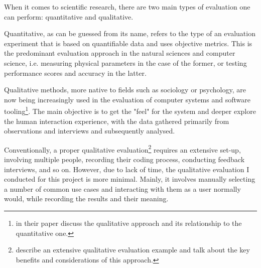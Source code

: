 \documentclass[sigplan,screen]{acmart}
\begin{document}
When it comes to scientific research, there are two main types of evaluation one can perform: quantitative and qualitative.

Quantitative, as can be guessed from its name, refers to the type of an evaluation experiment that is based on quantifiable data and uses objective metrics. This is the predominant evaluation approach in the natural sciences and computer science, i.e. measuring physical parameters in the case of the former, or testing performance scores and accuracy in the latter.

Qualitative methods, more native to fields such as sociology or psychology, are now being increasingly used in the evaluation of computer systems and software tooling\footnote{\cite{Hazz06a} in their paper discuss the qualitative approach and its relationship to the quantitative one.}. The main objective is to get the "feel" for the system and deeper explore the human interaction experience, with the data gathered primarily from observations and interviews and subsequently analysed.

Conventionally, a proper qualitative evaluation\footnote{\cite{Kapl05a} describe an extensive qualitative evaluation example and talk about the key benefits and considerations of this approach.} requires an extensive set-up, involving multiple people, recording their coding process, conducting feedback interviews, and so on. However, due to lack of time, the qualitative evaluation I conducted for this project is more minimal. Mainly, it involves manually selecting a number of common use cases and interacting with them as a user normally would, while recording the results and their meaning.
\end{document}
